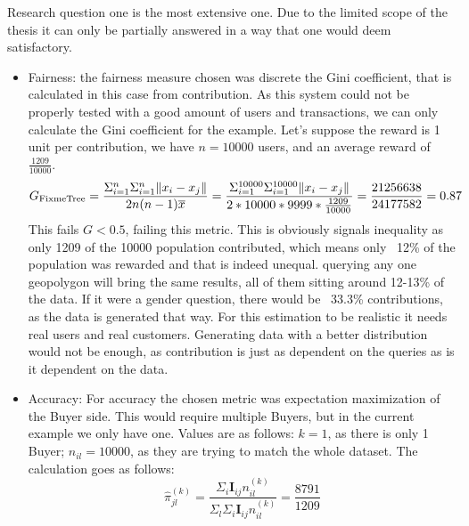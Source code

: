\documentclass[a4paper,11pt]{report} %
\theoremstyle{change}
\theoremstyle{theoremstyle}
\begin{document}
Research question one is the most extensive one. Due to the limited scope of the thesis it can only be partially answered in a way that one would deem satisfactory.
\begin{itemize}
    \item Fairness: the fairness measure chosen was discrete the Gini coefficient, that is calculated in this case from contribution. As this system could not be properly tested with a good amount of users and transactions, we can only calculate the Gini coefficient for the example. Let's suppose the reward is 1 unit per contribution, we have $n = 10000$ users, and an average reward of $\frac{1209}{10000}$.
    \begin{equation*}
        G_{\text{FixmeTree}}=\frac{\Sigma^{n}_{i=1}\Sigma^{n}_{i=1}\| x_i-x_j \|}{2n(n-1)\overline{x}} = \frac{\Sigma^{10000}_{i=1}\Sigma^{10000}_{i=1}\| x_i-x_j \|}{2*10000*9999*\frac{1209}{10000}}=\\
        \frac{21256638}{24177582} = 0.87
    \end{equation*}
    This fails $G < 0.5$, failing this metric.
    This is obviously signals inequality as only 1209 of the 10000 population contributed, which means only ~12\% of the population was rewarded and that is indeed unequal. querying any one geopolygon will bring the same results, all of them sitting around 12-13\% of the data. If it were a gender question, there would be ~33.3\% contributions, as the data is generated that way. For this estimation to be realistic it needs real users and real customers. Generating data with a better distribution would not be enough, as contribution is just as dependent on the queries as is it dependent on the data.
    \item Accuracy: For accuracy the chosen metric was expectation maximization of the Buyer side. This would require multiple Buyers, but in the current example we only have one. Values are as follows: $k=1$, as there is only 1 Buyer; $n_{il} = 10000$, as they are trying to match the whole dataset. The calculation goes as follows:
    \begin{equation*}
        \hat{\pi}^{(k)}_{jl} = \frac{\Sigma_i \mathbf{I}_{ij} n^{(k)}_{il}}{\Sigma_l \Sigma_i \mathbf{I}_{ij}n^{(k)}_{il}} = \frac{8791}{1209}
    \end{equation*}

\end{itemize}
\end{document}
